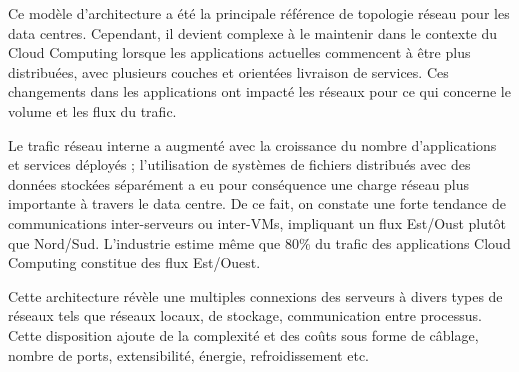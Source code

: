 Ce modèle d'architecture a été la principale référence de topologie réseau pour les data centres. Cependant, il devient complexe à le maintenir dans le contexte du Cloud Computing lorsque les applications actuelles commencent à être plus distribuées, avec plusieurs couches et orientées livraison de services. Ces changements dans les applications ont impacté les réseaux pour ce qui concerne le volume et les flux du trafic. 

Le trafic réseau interne a augmenté avec la croissance du nombre d'applications et services déployés ; l'utilisation de systèmes de fichiers distribués avec des données stockées séparément a eu pour conséquence une charge réseau plus importante à travers le data centre. De ce fait, on constate une forte tendance de communications inter-serveurs ou inter-VMs, impliquant un flux Est/Oust plutôt que Nord/Sud. L'industrie estime même que 80\% du trafic des applications Cloud Computing constitue des flux Est/Ouest.



Cette architecture révèle une multiples connexions des serveurs à divers types de réseaux tels que réseaux locaux, de stockage, communication entre processus. Cette disposition ajoute de la complexité et des coûts sous forme de câblage, nombre de ports, extensibilité, énergie, refroidissement etc. 

